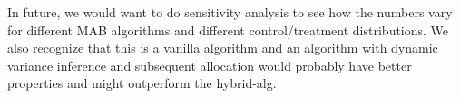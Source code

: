 \documentclass[letterpaper,11pt]{article}
\begin{document}
In future, we would want to do sensitivity analysis to see how the numbers vary for different MAB algorithms and different control/treatment distributions. We also recognize that this is a vanilla algorithm and an algorithm with dynamic variance inference and subsequent allocation would probably have better properties and might outperform the hybrid-alg. \\


{}

\end{document}
